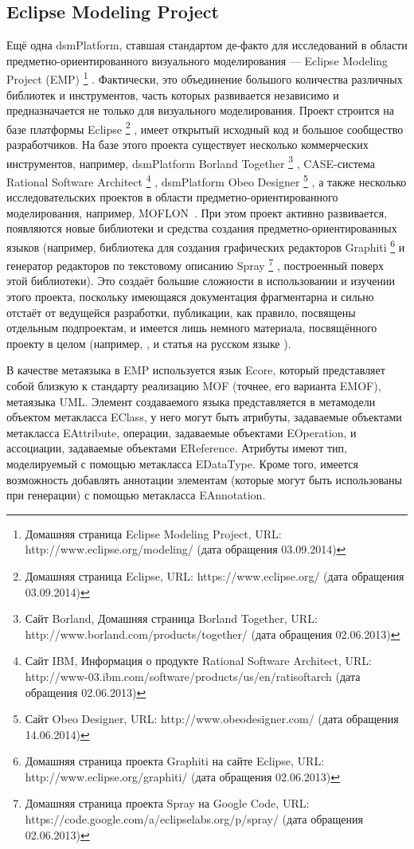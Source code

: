 \subsection{Eclipse Modeling Project}
Ещё одна \ac{dsmPlatform}, ставшая стандартом де-факто для исследований в области предметно-ориентированного визуального моделирования --- 
Eclipse Modeling Project (EMP)%
\footnote{Домашняя страница Eclipse Modeling Project, URL: http://www.eclipse.org/modeling/ (дата обращения 03.09.2014)}%
. Фактически, это объединение большого количества различных библиотек и инструментов, часть которых развивается 
независимо и предназначается не только для визуального моделирования. Проект строится на базе платформы Eclipse%
\footnote{Домашняя страница Eclipse, URL: https://www.eclipse.org/ (дата обращения 03.09.2014)}%
, имеет открытый исходный код и большое сообщество разработчиков. На базе этого 
проекта существует несколько коммерческих инструментов, например, \ac{dsmPlatform} Borland Together%
\footnote{Сайт Borland, Домашняя страница Borland Together, URL: http://www.borland.com/products/together/ (дата обращения 02.06.2013)}%
, CASE-система Rational Software Architect%
\footnote{Сайт IBM, Информация о продукте Rational Software Architect, 
URL: http://www-03.ibm.com/software/products/us/en/ratisoftarch (дата обращения 02.06.2013)}%
, \ac{dsmPlatform} Obeo Designer%
\footnote{Сайт Obeo Designer, URL: http://www.obeodesigner.com/ (дата обращения 14.06.2014)}%
, а также несколько исследовательских проектов в области предметно-ориентированного моделирования, например, 
MOFLON~\cite{amelunxen2008metamodel}. При этом проект активно развивается, появляются 
новые библиотеки и средства создания предметно-ориентированных языков (например, библиотека для создания графических редакторов Graphiti%
\footnote{Домашняя страница проекта Graphiti на сайте Eclipse, URL: http://www.eclipse.org/graphiti/ (дата обращения 02.06.2013)}
и генератор редакторов по текстовому описанию Spray%
\footnote{Домашняя страница проекта Spray на Google Code, URL: https://code.google.com/a/eclipselabs.org/p/spray/ (дата обращения 02.06.2013)}%
, построенный поверх этой библиотеки). Это создаёт большие сложности в использовании и изучении этого проекта, поскольку имеющаяся документация 
фрагментарна и сильно отстаёт от ведущейся разработки, публикации, как правило, посвящены 
отдельным подпроектам, и имеется лишь немного материала, посвящённого проекту в целом 
(например, \cite{gronback2009eclipse}, и статья на русском языке \cite{sorokin2010obzor}).

В качестве метаязыка в EMP используется язык Ecore, который представляет собой близкую 
к стандарту реализацию MOF (точнее, его варианта EMOF), метаязыка UML. Элемент создаваемого 
языка представляется в метамодели объектом метакласса EClass, у него могут быть атрибуты, 
задаваемые объектами метакласса EAttribute, операции, задаваемые объектами EOperation, и 
ассоциации, задаваемые объектами EReference. Атрибуты имеют тип, моделируемый с помощью 
метакласса EDataType. Кроме того, имеется возможность добавлять аннотации элементам 
(которые могут быть использованы при генерации) с помощью метакласса EAnnotation.

